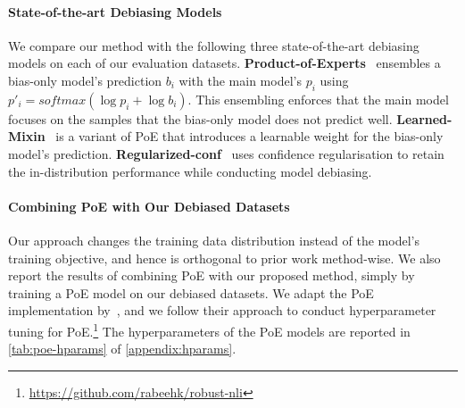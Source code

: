 \paragraph{State-of-the-art Debiasing Models}
We compare our method with the following three state-of-the-art debiasing models on each of our evaluation datasets.
\textbf{Product-of-Experts}~\citep{he-etal-2019-unlearn,karimi-mahabadi-etal-2020-end} ensembles a bias-only model's prediction $b_i$ with the main model's $p_i$ using $p'_i=softmax(\log p_i + \log b_i)$.
This ensembling enforces that the main model focuses on the samples that the bias-only model does not predict well.
\textbf{Learned-Mixin}~\citep{clark-etal-2019-dont} is a variant of PoE that introduces a learnable weight for the bias-only model's prediction.
\textbf{Regularized-conf}~\citep{utama-etal-2020-mind} uses confidence regularisation to retain the in-distribution performance while conducting model debiasing.




\paragraph{Combining PoE with Our Debiased Datasets}
Our approach changes the training data distribution instead of the model's training objective, and hence is orthogonal to prior work method-wise.
We also report the results of combining PoE with our proposed method, simply by training a PoE model on our debiased datasets.
We adapt the PoE implementation by~\citet{karimi-mahabadi-etal-2020-end}, and we follow their approach to conduct hyperparameter tuning for PoE.\footnote{\url{https://github.com/rabeehk/robust-nli}}
The hyperparameters of the PoE models are reported in \cref{tab:poe-hparams} of \cref{appendix:hparams}.


